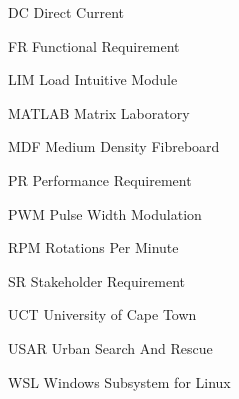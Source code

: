 \clearpage
\begin{Nomencl}[1cm]
\item[DC] Direct Current
\item[FR] Functional Requirement
\item[LIM] Load Intuitive Module
\item[MATLAB] Matrix Laboratory
\item[MDF] Medium Density Fibreboard
\item[PR] Performance Requirement
\item[PWM] Pulse Width Modulation
\item[RPM] Rotations Per Minute
\item[SR] Stakeholder Requirement
\item[UCT] University of Cape Town
\item[USAR] Urban Search And Rescue
\item[WSL] Windows Subsystem for Linux
\end{Nomencl}
